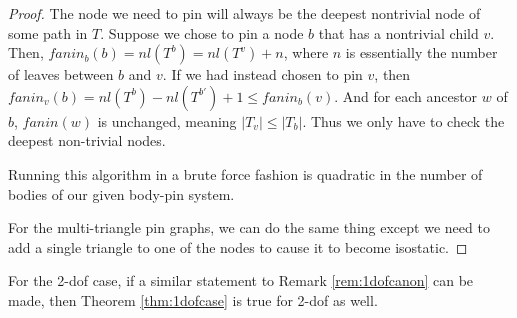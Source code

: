 \begin{proof}

    The node we need to pin will always be the deepest nontrivial node of some path in $T$. Suppose we chose to pin a node $b$ that has a nontrivial child $v$. Then, $fanin_b(b) = nl(T^b) = nl(T^v) + n$, where $n$ is essentially the number of leaves between $b$ and $v$. If we had instead chosen to pin $v$, then $fanin_v(b) = nl(T^b) - nl(T^{b'}) + 1 \leq fanin_b(v)$. And for each ancestor $w$ of $b$, $fanin(w)$ is unchanged, meaning $|T_v| \leq |T_b|$. Thus we only have to check the deepest non-trivial nodes.

    Running this algorithm in a brute force fashion is quadratic in the number of bodies of our given body-pin system.

    For the multi-triangle pin graphs, we can do the same thing except we need to add a single triangle to one of the nodes to cause it to become isostatic.

\end{proof}


\begin{observation}
    For the 2-dof case, if a similar statement to Remark \ref{rem:1dofcanon} can be made, then Theorem \ref{thm:1dofcase} is true for 2-dof as well.
\end{observation}

